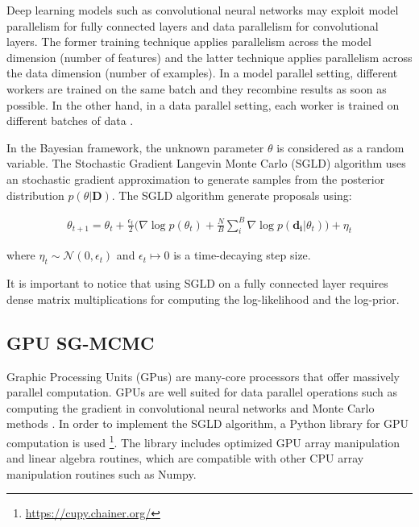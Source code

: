 \documentclass[conference]{IEEEtran}
\begin{document}
Deep learning models such as convolutional neural networks may exploit model parallelism for fully connected layers and data parallelism for convolutional layers. The former training technique applies parallelism across the model dimension (number of features) and the latter technique applies parallelism across the data dimension (number of examples). In a model parallel setting, different workers are trained on the same batch and they recombine results as soon as possible. In the other hand, in a data parallel setting, each worker is trained on different batches of data \cite{LI201695}. 

In the Bayesian framework, the unknown parameter $\theta$ is considered as a random variable. The Stochastic Gradient Langevin Monte Carlo (SGLD) algorithm uses an stochastic gradient approximation to generate samples from the posterior distribution $p(\theta \vert \mathbf{D})$. The SGLD algorithm generate proposals using:

\begin{align}
\theta_{t+1}=\theta_{t}+\frac{\epsilon_t}{2}\Big(\nabla\operatorname{log}p(\theta_{t})+\frac{N}{B} \sum_i^B \nabla \operatorname{log} p(\mathbf{d_i} \vert \theta_{t})\Big) + \eta_t
\label{eq:sgld}
\end{align}

where $\eta_t \sim \mathcal N(0,\epsilon_t)$ and $\epsilon_t \mapsto 0$ is a time-decaying step size.

It is important to notice that using SGLD on a fully connected layer requires dense matrix multiplications for computing the log-likelihood and the log-prior. 

\subsection{GPU SG-MCMC}
Graphic Processing Units (GPus) are many-core processors that offer massively parallel computation. GPUs are well suited for data parallel operations such as computing the gradient in convolutional neural networks and Monte Carlo methods \cite{lee2010utility}. In order to implement the SGLD algorithm, a Python library for GPU computation is used \footnote{\url{https://cupy.chainer.org/}}. The library includes optimized GPU array manipulation and linear algebra routines, which are compatible with other CPU array manipulation routines such as Numpy. 
 
\end{document}
